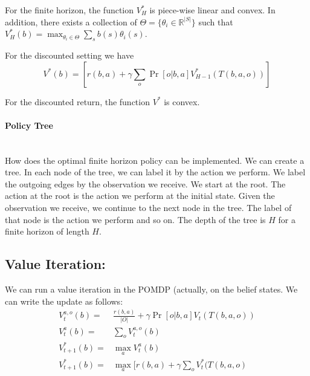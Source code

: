 \begin{theorem}
For the finite horizon, the function $V^*_H$ is piece-wise linear
and convex. In addition, there exists a collection of
$\Theta=\{\theta_i\in \mathbb{R}^{|S|}\}$ such that
$V^*_H(b)=\max_{\theta_i\in\Theta} \sum_s b(s)\theta_i(s)$.
\end{theorem}

For the discounted setting we have
\[
V^*(b)=[r(b,a)+\gamma\sum_o \Pr[o|b,a]V^*_{H-1}(T(b,a,o))]
\]
\begin{theorem}
For the discounted return, the function $V^*$ is convex.
\end{theorem}

\paragraph{Policy Tree}\ \\
How does the optimal finite horizon policy can be implemented. We
can create a tree. In each node of the tree, we can label it by the
action we perform. We label the outgoing edges by the observation we
receive. We start at the root. The action at the root is the action
we perform at the initial state. Given the observation we receive,
we continue to the next node in the tree. The label of that node is
the action we perform and so on. The depth of the tree is $H$ for a
finite horizon of length $H$.

\subsection{Value Iteration:}

We can run a value iteration in the POMDP (actually, on the belief
states. We can write the update as follows:
\begin{align*}
V^{a,o}_{t}(b)=&\frac{r(b,a)}{|O|}+\gamma\Pr[o|b,a]V_t(T(b,a,o))\\
V_{t}^a(b)=&\sum_o V^{a,o}_{t}(b)\\
V_{t+1}^*(b)=&\max_a V_{t}^a(b)\\
V_{t+1}^*(b) =& \max_a [r(b,a)+\gamma\sum_o V_t^*(T(b,a,o)
\end{align*}

